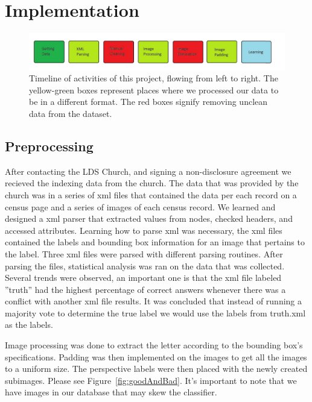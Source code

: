 \section{Implementation}

\begin{figure}[ht]
  \centering
  \includegraphics[width=\textwidth]{images/Timeline.png}
  \caption{
    Timeline of activities of this project, flowing from left to right.  The
    yellow-green boxes represent places where we processed our data to be in a
    different format.  The red boxes signify removing unclean data from the
    dataset.
    }
  \label{fig:timeline}
\end{figure}

\subsection{Preprocessing}
After contacting the LDS Church, and signing a non-disclosure agreement we recieved the indexing data from the church. The data that was provided by the church was in a series of xml files that contained the data per each record on a census page and a series of images of each census record.  We learned and designed a xml parser that extracted values from nodes, checked headers, and  accessed attributes.  Learning how to parse xml was necessary, the xml files contained the labels and bounding box information for an image that pertains to the label.  Three xml files were parsed with different parsing routines.  After parsing the files, statistical analysis was ran on the data that was collected.  Several trends were observed, an important one is that the xml file labeled ''truth'' had the highest percentage of correct answers whenever there was a conflict with another xml file results. It was concluded that instead of running a majority vote to determine the true label we would use the labels from truth.xml as the labels. 

Image processing was done to extract the letter according to the bounding box's specifications.  Padding was then implemented on the images to get all the images to a uniform size.  The perspective labels were then placed with the newly created subimages.  Please see Figure~\ref{fig:goodAndBad}. It’s important to note that we have images in our database that may skew the classifier.


